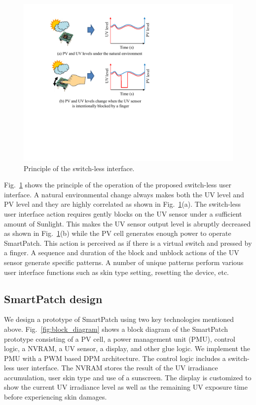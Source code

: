 \documentclass[journal]{IEEEtran}
\begin{document}
\begin{figure}
\centering
\includegraphics[width=0.8\hsize]{Figures/switchless_interface.pdf}
\caption{Principle of the switch-less interface.}
\label{fig:switchless_interface}
\end{figure}

Fig.~\ref{fig:switchless_interface} shows the principle of the operation of the proposed switch-less user interface.
A natural environmental change always makes both the UV level and PV level and they are highly correlated as shown in Fig.~\ref{fig:switchless_interface}(a).
The switch-less user interface action requires gently blocks on the UV sensor under a sufficient amount of Sunlight.
This makes the UV sensor output level is abruptly decreased as shown in Fig.~\ref{fig:switchless_interface}(b) while the PV cell generates enough power to operate SmartPatch.
This action is perceived as if there is a virtual switch and pressed by a finger.
A sequence and duration of the block and unblock actions of the UV sensor generate specific patterns.
A number of unique patterns perform various user interface functions such as skin type setting, resetting the device, etc.

\subsection{SmartPatch design}

We design a prototype of SmartPatch using two key technologies mentioned above.
Fig.~\ref{fig:block_diagram} shows a block diagram of the SmartPatch prototype consisting of a PV cell, a power management unit (PMU), control logic, a NVRAM, a UV sensor, a display, and other glue logic.
We implement the PMU with a PWM based DPM architecture.
The control logic includes a switch-less user interface.
The NVRAM stores the result of the UV irradiance accumulation, user skin type and use of a sunscreen.
The display is customized to show the current UV irradiance level as well as the remaining UV exposure time before experiencing skin damages.
\end{document}

